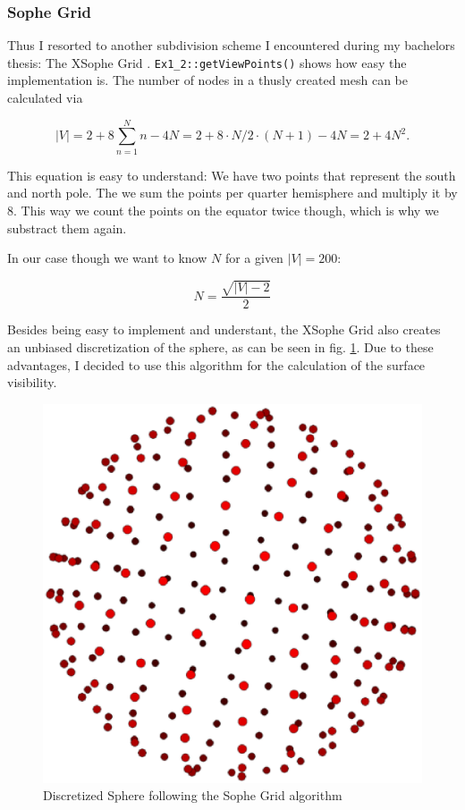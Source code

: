 \documentclass[a4paper,10pt,notitlepage]{scrreprt}
\begin{document}
\subsubsection{Sophe Grid}

Thus I resorted to another subdivision scheme I encountered during my
bachelors thesis: The XSophe Grid \cite{Hanson2004903}.
\texttt{Ex1\_2::getViewPoints()} shows how easy the implementation is. The
number of nodes in a thusly created mesh can be calculated via

\begin{equation}
 |V| = 2 + 8 \sum_{n=1}^N n - 4 N = 2 + 8 \cdot N/2 \cdot (N+1) - 4N = 2 + 4N^2.
\end{equation}

This equation is easy to understand: We have two points that represent the
south and north pole. The we sum the points per quarter hemisphere and multiply
it by 8. This way we count the points on the equator twice though, which is why
we substract them again.

In our case though we want to know $N$ for a given $|V| = 200$:

\begin{equation}
 N = \frac{\sqrt{|V| - 2}}{2}
\end{equation}

Besides being easy to implement and understant, the XSophe Grid also creates an
unbiased discretization of the sphere, as can be seen in fig.
\ref{fig:grid-sophe}. Due to these advantages, I decided to use this algorithm
for the calculation of the surface visibility.

\begin{figure}
 \centering
 \includegraphics[scale=0.5]{sophe-grid.eps}
 \caption{Discretized Sphere following the Sophe Grid algorithm}
 \label{fig:grid-sophe}
\end{figure}
\end{document}

